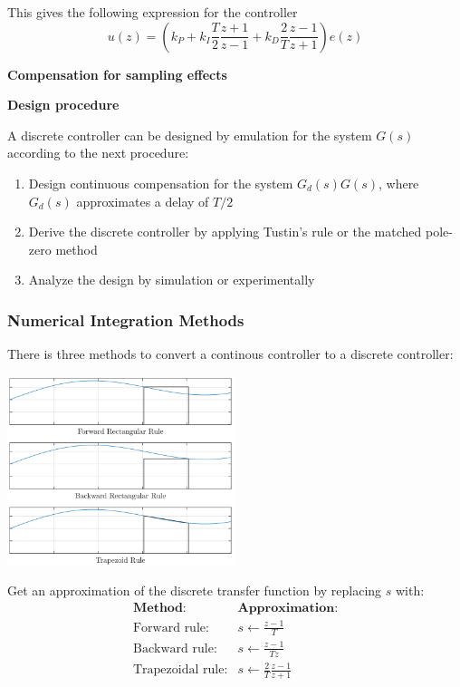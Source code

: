 This gives the following expression for the controller
$$u(z) = (k_P+k_I \frac{T}{2} \frac{z+1}{z-1}+k_D \frac{2}{T} \frac{z-1}{z+1})e(z)$$


\textbf{Compensation for sampling effects}

\newpage
\textbf{Design procedure}

A discrete controller can be designed by emulation for the system $G(s)$ according to the next procedure:

\begin{enumerate}
	\item{Design continuous compensation for the system $G_d(s)G(s)$, where $G_d(s)$ approximates a delay of $T/2$}
	\item{Derive the discrete controller by applying Tustin's rule or the matched pole-zero method}
	\item{Analyze the design by simulation or experimentally}
\end{enumerate}



\subsubsection{Numerical Integration Methods}
There is three methods to convert a continous controller to a discrete controller:
\begin{center}
	\includegraphics[width=0.5\textwidth]{Images/Numerical-Integration.png}
\end{center}
Get an approximation of the discrete transfer function by replacing $s$ with:
$$\begin{array}{cc}
  \textbf{Method:}& \textbf{Approximation:} \\
  \text{Forward rule:}& s\gets\frac{z-1}{T} \\
  \text{Backward rule:}& s\gets\frac{z-1}{Tz} \\
  \text{Trapezoidal rule:}& s\gets\frac{2}{T} \frac{z-1}{z+1}
\end{array}$$

